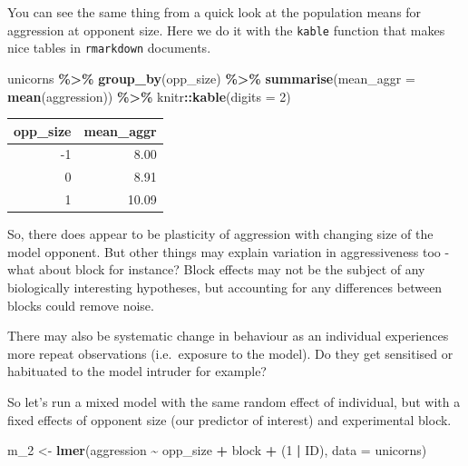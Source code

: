 \documentclass[
  12pt,
]{book}
\newenvironment{Shaded}{\begin{snugshade}}{\end{snugshade}}
\newcommand{\DataTypeTok}[1]{\textcolor[rgb]{0.13,0.29,0.53}{#1}}
\newcommand{\DecValTok}[1]{\textcolor[rgb]{0.00,0.00,0.81}{#1}}
\newcommand{\KeywordTok}[1]{\textcolor[rgb]{0.13,0.29,0.53}{\textbf{#1}}}
\newcommand{\NormalTok}[1]{#1}
\newcommand{\OperatorTok}[1]{\textcolor[rgb]{0.81,0.36,0.00}{\textbf{#1}}}
\newcommand{\StringTok}[1]{\textcolor[rgb]{0.31,0.60,0.02}{#1}}
\begin{document}
You can see the same thing from a quick look at the population means for aggression at opponent size. Here we do it with the \texttt{kable} function that makes nice tables in \texttt{rmarkdown} documents.

\begin{Shaded}
\begin{Highlighting}[]
\NormalTok{unicorns }\OperatorTok{\%\textgreater{}\%}
\StringTok{  }\KeywordTok{group\_by}\NormalTok{(opp\_size) }\OperatorTok{\%\textgreater{}\%}
\StringTok{  }\KeywordTok{summarise}\NormalTok{(}\DataTypeTok{mean\_aggr =} \KeywordTok{mean}\NormalTok{(aggression)) }\OperatorTok{\%\textgreater{}\%}
\StringTok{  }\NormalTok{knitr}\OperatorTok{::}\KeywordTok{kable}\NormalTok{(}\DataTypeTok{digits =} \DecValTok{2}\NormalTok{)}
\end{Highlighting}
\end{Shaded}

\begin{tabular}{r|r}
\hline
opp\_size & mean\_aggr\\
\hline
-1 & 8.00\\
\hline
0 & 8.91\\
\hline
1 & 10.09\\
\hline
\end{tabular}

So, there does appear to be plasticity of aggression with changing size of the model opponent. But other things may explain variation in aggressiveness too - what about block for instance? Block effects may not be the subject of any biologically interesting hypotheses, but accounting for any differences between blocks could remove noise.

There may also be systematic change in behaviour as an individual experiences more repeat observations (i.e.~exposure to the model). Do they get sensitised or habituated to the model intruder for example?

So let's run a mixed model with the same random effect of individual, but with a fixed effects of opponent size (our predictor of interest) and experimental block.

\begin{Shaded}
\begin{Highlighting}[]
\NormalTok{m\_}\DecValTok{2}\NormalTok{ \textless{}{-}}\StringTok{ }\KeywordTok{lmer}\NormalTok{(aggression }\OperatorTok{\textasciitilde{}}\StringTok{ }\NormalTok{opp\_size }\OperatorTok{+}\StringTok{ }\NormalTok{block }\OperatorTok{+}\StringTok{ }\NormalTok{(}\DecValTok{1} \OperatorTok{|}\StringTok{ }\NormalTok{ID), }\DataTypeTok{data =}\NormalTok{ unicorns)}
\end{Highlighting}
\end{Shaded}
\end{document}
